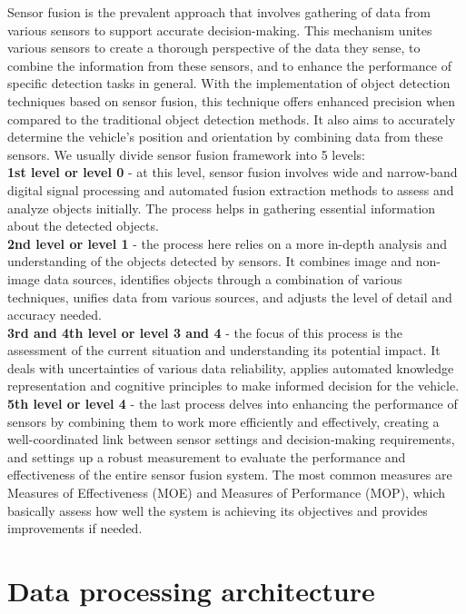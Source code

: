 \documentclass[10pt,oneside,english,a4paper]{article}
\begin{document}
\indent Sensor fusion is the prevalent approach that involves gathering of data from various sensors to support accurate decision-making. This mechanism unites various sensors to create a thorough perspective of the data they sense, to combine the information from these sensors, and to enhance the performance of specific detection tasks in general. With the implementation of object detection techniques based on sensor fusion, this technique offers enhanced precision when compared to the traditional object detection methods. It also aims to accurately determine the vehicle's position and orientation by combining data from these sensors. We usually divide sensor fusion framework into 5 levels:\\
\indent \textbf{1st level or level 0} - at this level, sensor fusion involves wide and narrow-band digital signal processing and automated fusion extraction methods to assess and analyze objects initially. The process helps in gathering essential information about the detected objects.\\
\indent \textbf{2nd level or level 1} - the process here relies on a more in-depth analysis and understanding of the objects detected by sensors. It combines image and non-image data sources, identifies objects through a combination of various techniques, unifies data from various sources, and adjusts the level of detail and accuracy needed.\\ 
\indent \textbf{3rd and 4th level or level 3 and 4} - the focus of this process is the assessment of the current situation and understanding its potential impact. It deals with uncertainties of various data reliability, applies automated knowledge representation and cognitive principles to make informed decision for the vehicle.\\
\indent \textbf{5th level or level 4} - the last process delves into enhancing the performance of sensors by combining them to work more efficiently and effectively, creating a well-coordinated link between sensor settings and decision-making requirements, and settings up a robust measurement to evaluate the performance and effectiveness of the entire sensor fusion system. The most common measures are Measures of Effectiveness (MOE) and Measures of Performance (MOP), which basically assess how well the system is achieving its objectives and provides improvements if needed.
\cite{AIandIoT}\cite{stateoftheart}\cite{Sensorfusion}





\section{Data processing architecture} \label{architecture}
\end{document}
